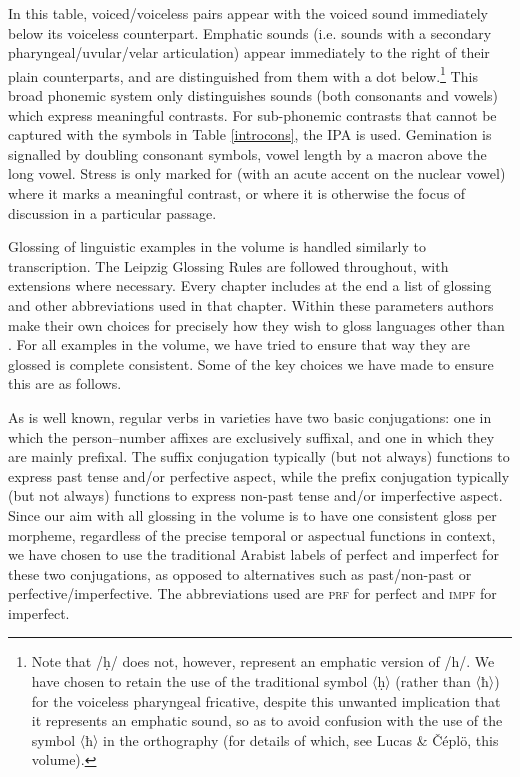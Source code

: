 \documentclass[output=paper]{langsci/langscibook}
\begin{document}
In this table, voiced/voiceless pairs appear with the voiced sound immediately below its voiceless counterpart. Emphatic sounds (i.e. sounds with a secondary {pharyngeal}/uvular/velar articulation) appear immediately to the right of their plain counterparts, and are distinguished from them with a dot below.\footnote{Note that /ḥ/ does not, however, represent an {emphatic} version of /h/. We have chosen to retain the use of the traditional symbol 〈ḥ〉 (rather than 〈ħ〉) for the voiceless {pharyngeal} fricative, despite this unwanted implication that it represents an {emphatic} sound, so as to avoid confusion with the use of the symbol 〈ħ〉 in the  {orthography} (for details of which, see Lucas \& Čéplö,  this volume).} This broad phonemic system only distinguishes sounds (both consonants and vowels) which express meaningful contrasts. For sub-phonemic contrasts that cannot be captured with the symbols in Table \ref{introcons}, the IPA is used. Gemination is signalled by doubling consonant symbols, {vowel length} by a macron above the {long vowel}. Stress is only marked for  (with an acute accent on the nuclear vowel) where it marks a meaningful contrast, or where it is otherwise the focus of discussion in a particular passage.

Glossing of linguistic examples in the volume is handled similarly to transcription. The Leipzig Glossing Rules are followed throughout, with extensions where necessary. Every chapter includes at the end a list of glossing and other abbreviations used in that chapter. Within these parameters authors make their own choices for precisely how they wish to gloss languages other than . For all  examples in the volume, we have tried to ensure that way they are glossed is complete consistent. Some of the key choices we have made to ensure this are as follows.

As is well known, regular verbs in  varieties have two basic conjugations: one in which the person--number affixes are exclusively suffixal, and one in which they are mainly prefixal. The suffix conjugation typically (but not always) functions to express past {tense} and/or perfective aspect, while the prefix conjugation typically (but not always) functions to express non-past {tense} and/or imperfective aspect. Since our aim with all glossing in the volume is to have one consistent gloss per morpheme, regardless of the precise temporal or aspectual functions in context, we have chosen to use the traditional Arabist labels of perfect and imperfect for these two conjugations, as opposed to alternatives such as past/non-past or perfective/imperfective. The abbreviations used are \textsc{prf} for perfect and \textsc{impf} for imperfect.
\end{document}
